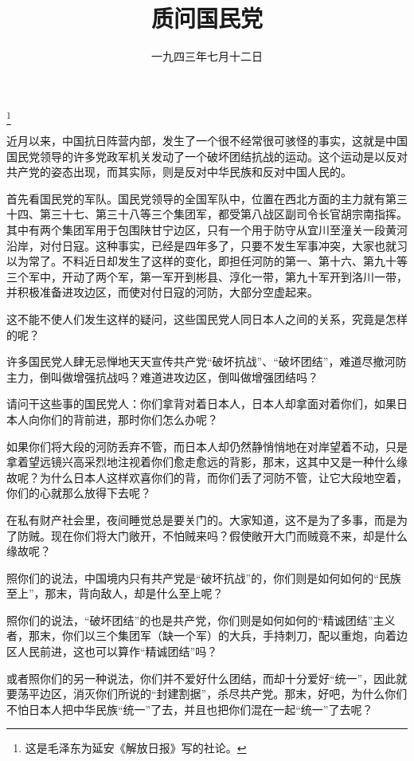 
\title{质问国民党}
\date{一九四三年七月十二日}
\thanks{这是毛泽东为延安《解放日报》写的社论。}
\maketitle


近月以来，中国抗日阵营内部，发生了一个很不经常很可骇怪的事实，这就是中国国民党领导的许多党政军机关发动了一个破坏团结抗战的运动。这个运动是以反对共产党的姿态出现，而其实际，则是反对中华民族和反对中国人民的。

首先看国民党的军队。国民党领导的全国军队中，位置在西北方面的主力就有第三十四、第三十七、第三十八等三个集团军，都受第八战区副司令长官胡宗南指挥。其中有两个集团军用于包围陕甘宁边区，只有一个用于防守从宜川至潼关一段黄河沿岸，对付日寇。这种事实，已经是四年多了，只要不发生军事冲突，大家也就习以为常了。不料近日却发生了这样的变化，即担任河防的第一、第十六、第九十等三个军中，开动了两个军，第一军开到彬县、淳化一带，第九十军开到洛川一带，并积极准备进攻边区，而使对付日寇的河防，大部分空虚起来。

这不能不使人们发生这样的疑问，这些国民党人同日本人之间的关系，究竟是怎样的呢？

许多国民党人肆无忌惮地天天宣传共产党“破坏抗战”、“破坏团结”，难道尽撤河防主力，倒叫做增强抗战吗？难道进攻边区，倒叫做增强团结吗？

请问干这些事的国民党人：你们拿背对着日本人，日本人却拿面对着你们，如果日本人向你们的背前进，那时你们怎么办呢？

如果你们将大段的河防丢弃不管，而日本人却仍然静悄悄地在对岸望着不动，只是拿着望远镜兴高采烈地注视着你们愈走愈远的背影，那末，这其中又是一种什么缘故呢？为什么日本人这样欢喜你们的背，而你们丢了河防不管，让它大段地空着，你们的心就那么放得下去呢？

在私有财产社会里，夜间睡觉总是要关门的。大家知道，这不是为了多事，而是为了防贼。现在你们将大门敞开，不怕贼来吗？假使敞开大门而贼竟不来，却是什么缘故呢？

照你们的说法，中国境内只有共产党是“破坏抗战”的，你们则是如何如何的“民族至上”，那末，背向敌人，却是什么至上呢？

照你们的说法，“破坏团结”的也是共产党，你们则是如何如何的“精诚团结”主义者，那末，你们以三个集团军（缺一个军）的大兵，手持刺刀，配以重炮，向着边区人民前进，这也可以算作“精诚团结”吗？

或者照你们的另一种说法，你们并不爱好什么团结，而却十分爱好“统一”，因此就要荡平边区，消灭你们所说的“封建割据”，杀尽共产党。那末，好吧，为什么你们不怕日本人把中华民族“统一”了去，并且也把你们混在一起“统一”了去呢？

